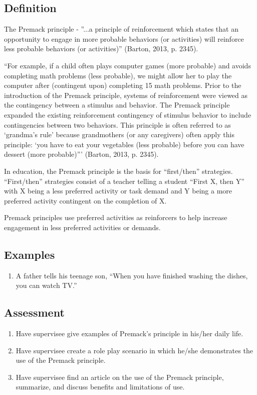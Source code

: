 \subsection{Definition} 
The Premack principle - ''...a principle of reinforcement which states that an opportunity to engage in more probable behaviors (or activities) will reinforce less probable behaviors (or activities)'' (Barton, 2013, p. 2345).

``For example, if a child often plays computer games (more probable) and avoids completing math problems (less probable), we might allow her to play the computer after (contingent upon) completing 15 math problems. Prior to the introduction of the Premack principle, systems of reinforcement were viewed as the contingency between a stimulus and behavior. The Premack principle expanded the existing reinforcement contingency of stimulus behavior to include contingencies between two behaviors. This principle is often referred to as ‘grandma's rule' because grandmothers (or any caregivers) often apply this principle: ‘you have to eat your vegetables (less probable) before you can have dessert (more probable)''' (Barton, 2013, p. 2345).

In education, the Premack principle is the basis for ``first/then'' strategies. ``First/then'' strategies consist of a teacher telling a student ``First X, then Y'' with X being a less preferred activity or task demand and Y being a more preferred activity contingent on the completion of X.

Premack principles use preferred activities as reinforcers to help increase engagement in less preferred activities or demands. 

\subsection{Examples}
\begin{enumerate}
\item A father tells his teenage son, ``When you have finished washing the dishes, you can watch TV.''
\end{enumerate}
%
\subsection{Assessment}
\begin{enumerate}
\item Have supervisee give examples of Premack's principle in his/her daily life.
\item Have supervisee create a role play scenario in which he/she demonstrates the use of the Premack principle.
\item Have supervisee find an article on the use of the Premack principle, summarize, and discuss benefits and limitations of use.
\end{enumerate}
%

